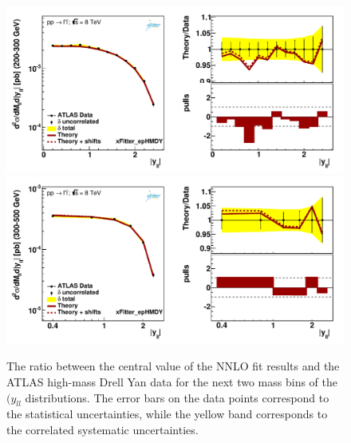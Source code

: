 \begin{figure}[t]
\centering
\includegraphics[width=16cm]{figs/data_403-1.pdf}\\
\includegraphics[width=16cm]{figs/data_404-1.pdf}
\caption{The ratio between the central value of the NNLO fit results
  and the ATLAS high-mass Drell Yan data
  for the next two mass bins of the $(y_{ll}$ distributions.
  The error bars on the data points correspond to the statistical
  uncertainties, while the yellow band
  corresponds to the correlated systematic uncertainties.
}
\label{hmDY_2D_2}
\end{figure}

